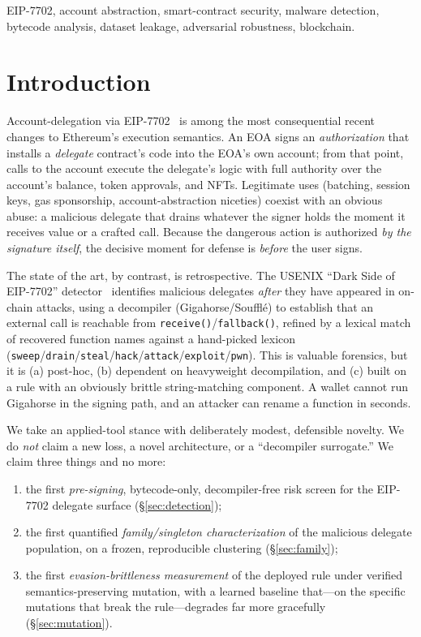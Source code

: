 \documentclass[conference]{IEEEtran}
\newcommand{\eip}{EIP-7702}
\newcommand{\code}[1]{\texttt{#1}}
\begin{document}
\begin{IEEEkeywords}
\eip{}, account abstraction, smart-contract security, malware detection, bytecode
analysis, dataset leakage, adversarial robustness, blockchain.
\end{IEEEkeywords}

\section{Introduction}
Account-delegation via \eip{}~\cite{eip7702} is among the most consequential recent
changes to Ethereum's execution semantics. An EOA signs an \emph{authorization} that
installs a \emph{delegate} contract's code into the EOA's own account; from that point,
calls to the account execute the delegate's logic with full authority over the account's
balance, token approvals, and NFTs. Legitimate uses (batching, session keys, gas
sponsorship, account-abstraction niceties) coexist with an obvious abuse: a malicious
delegate that drains whatever the signer holds the moment it receives value or a crafted
call. Because the dangerous action is authorized \emph{by the signature itself}, the
decisive moment for defense is \emph{before} the user signs.

The state of the art, by contrast, is retrospective. The USENIX ``Dark Side of \eip{}''
detector~\cite{darkside} identifies malicious delegates \emph{after} they have appeared
in on-chain attacks, using a decompiler (Gigahorse/Soufflé) to establish that an external
call is reachable from \code{receive()}/\code{fallback()}, refined by a lexical match of
recovered function names against a hand-picked lexicon
(\code{sweep}/\code{drain}/\code{steal}/\code{hack}/\code{attack}/\code{exploit}/\code{pwn}).
This is valuable forensics, but it is (a) post-hoc, (b) dependent on heavyweight
decompilation, and (c) built on a rule with an obviously brittle string-matching
component. A wallet cannot run Gigahorse in the signing path, and an attacker can rename a
function in seconds.

We take an applied-tool stance with deliberately modest, defensible novelty. We do
\emph{not} claim a new loss, a novel architecture, or a ``decompiler surrogate.'' We claim
three things and no more:
\begin{enumerate}
  \item the first \emph{pre-signing}, bytecode-only, decompiler-free risk screen for the
  \eip{} delegate surface (\S\ref{sec:detection});
  \item the first quantified \emph{family/singleton characterization} of the malicious
  delegate population, on a frozen, reproducible clustering (\S\ref{sec:family});
  \item the first \emph{evasion-brittleness measurement} of the deployed rule under
  verified semantics-preserving mutation, with a learned baseline that---on the specific
  mutations that break the rule---degrades far more gracefully (\S\ref{sec:mutation}).
\end{enumerate}
\end{document}
